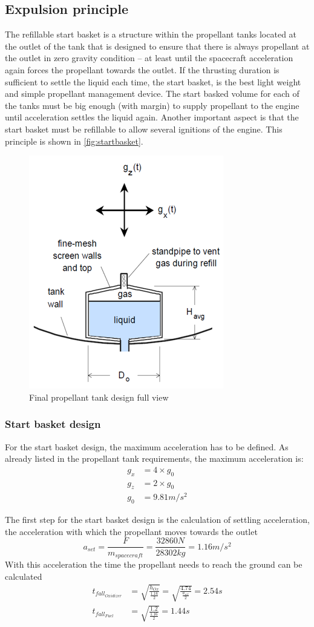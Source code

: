 \subsection{Expulsion principle}
The refillable start basket is a structure within the propellant tanks located at the outlet of the tank that is designed to ensure that there is always propellant at the outlet in zero gravity condition – at least until the spacecraft acceleration again forces the propellant towards the outlet. If the thrusting duration is sufficient to settle the liquid each time, the start basket, is the best light weight and simple propellant management device. The start basked volume for each of the tanks must be big enough (with margin) to supply propellant to the engine until acceleration settles the liquid again. Another important aspect is that the start basket must be refillable to allow several ignitions of the engine. This principle is shown in \autoref{fig:startbasket}.
\begin{figure}[H]
	\centering
	\includegraphics[width=0.3\linewidth]{startbasket}
	\caption{Final propellant tank design full view}\label{fig:startbasket}
\end{figure}
\subsubsection{Start basket design}
For the start basket design, the maximum acceleration has to be defined. As already listed in the propellant tank requirements, the maximum acceleration is:
\begin{align}
    g_x &= 4\times g_0\\
    g_z &= 2\times g_0\\
    g_0 &= 9.81 m/s^2
\end{align}{}

The first step for the start basket design is the calculation of settling acceleration, the acceleration with which the propellant moves towards the outlet
\begin{equation}
    a_{set} = \frac{F}{m_{spacecraft}} = \frac{32860N}{28302kg} = 1.16m/s^2
\end{equation}{}
With this acceleration the time the propellant needs to reach the ground can be calculated
\begin{align}
    t_{fall_{Oxidizer}} &= \sqrt{\frac{h_{Ox}}{\frac{1.16}{2}}} = \sqrt{\frac{4.74}{\frac{a_{set}}{2}}} =2.54s\\
    t_{fall_{Fuel}} &= \sqrt{\frac{1.2}{\frac{1.16}{2}}} = 1.44s
\end{align}{}

